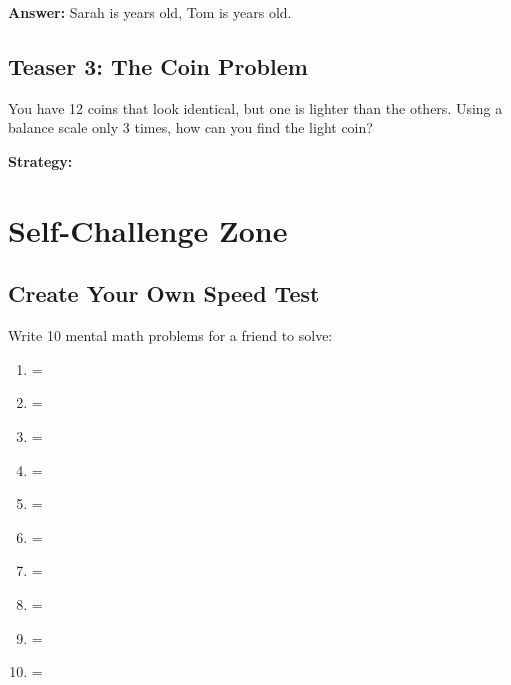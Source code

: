 \documentclass{article}
\begin{document}
\textbf{Answer:} Sarah is \underline{\hspace{2cm}} years old, Tom is \underline{\hspace{2cm}} years old.

\subsection*{Teaser 3: The Coin Problem}
You have 12 coins that look identical, but one is lighter than the others. Using a balance scale only 3 times, how can you find the light coin?

\textbf{Strategy:}
\vspace{4cm}

\section{Self-Challenge Zone}

\subsection*{Create Your Own Speed Test}
Write 10 mental math problems for a friend to solve:

\begin{enumerate}
    \item \underline{\hspace{6cm}} = \underline{\hspace{2cm}}
    \item \underline{\hspace{6cm}} = \underline{\hspace{2cm}}
    \item \underline{\hspace{6cm}} = \underline{\hspace{2cm}}
    \item \underline{\hspace{6cm}} = \underline{\hspace{2cm}}
    \item \underline{\hspace{6cm}} = \underline{\hspace{2cm}}
    \item \underline{\hspace{6cm}} = \underline{\hspace{2cm}}
    \item \underline{\hspace{6cm}} = \underline{\hspace{2cm}}
    \item \underline{\hspace{6cm}} = \underline{\hspace{2cm}}
    \item \underline{\hspace{6cm}} = \underline{\hspace{2cm}}
    \item \underline{\hspace{6cm}} = \underline{\hspace{2cm}}
\end{enumerate}
\end{document}

